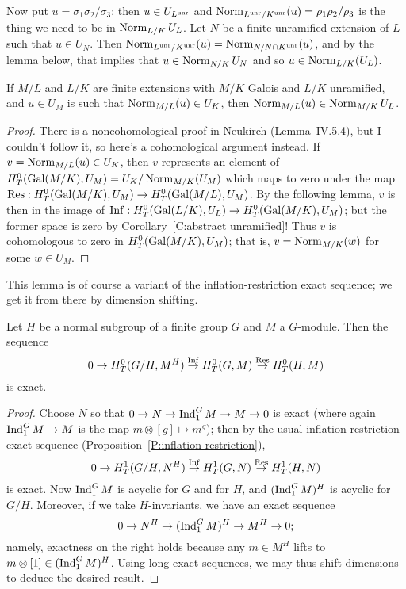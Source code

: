 Now put $u = \sigma_1 \sigma_2/\sigma_3$; then $u \in U_{L^{\operatorname{unr}}}$
and $\operatorname{Norm}_{L^{\operatorname{unr}}/K^{\operatorname{unr}}}(u) = \rho_1 \rho_2/\rho_3$ is the thing
we need to be in $\operatorname{Norm}_{L/K} U_L$. Let $N$ be a finite unramified
extension of $L$ such that $u \in U_N$. Then
$\operatorname{Norm}_{L^{\operatorname{unr}}/K^{\operatorname{unr}}}(u) = \operatorname{Norm}_{N/N \cap K^{\operatorname{unr}}}(u)$,
and by the lemma below, that implies that $u \in \operatorname{Norm}_{N/K} U_N$
and so $u \in \operatorname{Norm}_{L/K}(U_L)$.

\begin{lemma}
If $M/L$ and $L/K$ are finite extensions with $M/K$ Galois and
$L/K$ unramified, and
$u \in U_M$ is such that $\operatorname{Norm}_{M/L}(u) \in U_K$, then
$\operatorname{Norm}_{M/L}(u) \in \operatorname{Norm}_{M/K} U_L$.
\end{lemma}
\begin{proof}
There is a noncohomological proof in Neukirch (Lemma~IV.5.4), but
I couldn't follow it, so here's a cohomological argument instead.
If $v = \operatorname{Norm}_{M/L}(u) \in U_K$, then
$v$ represents an element of $H^0_T(\operatorname{Gal}(M/K), U_M) = U_K/\operatorname{Norm}_{M/K}(U_M)$
which maps
to zero under the map $\operatorname{Res}: H^0_T(\operatorname{Gal}(M/K), U_M) \to H^0_T(\operatorname{Gal}(M/L),
U_M)$. By the following lemma, $v$ is then in the image of
$\operatorname{Inf}: H^0_T(\operatorname{Gal}(L/K), U_L) \to H^0_T(\operatorname{Gal}(M/K), U_M)$; but the
former space is zero by Corollary~\ref{C:abstract unramified}! Thus $v$ is cohomologous to zero in
$H^0_T(\operatorname{Gal}(M/K), U_M)$; that is, $v = \operatorname{Norm}_{M/K}(w)$ for
some $w \in U_M$.
\end{proof}
This lemma is of course a variant of the inflation-restriction
exact sequence; we get it from there by dimension shifting.
\begin{lemma}
Let $H$ be a normal subgroup of a finite group $G$ and $M$ a
$G$-module. Then
the sequence
\[
0 \to H^0_T(G/H, M^H) \stackrel{\operatorname{Inf}}{\to}
H^0_T(G,M) \stackrel{\operatorname{Res}}{\to}
H^0_T(H,M)
\]
is exact.
\end{lemma}
\begin{proof}
Choose $N$ so that
$0 \to N \to \operatorname{Ind}^G_{1} M \to M \to 0$ is exact
(where again $\operatorname{Ind}^G_1 M \to M$ is the map $m \otimes [g] \mapsto m^g$);
then by the usual inflation-restriction
exact sequence (Proposition~\ref{P:inflation restriction}),
\[
0 \to H^1_T(G/H, N^H) \stackrel{\operatorname{Inf}}{\to} H^1_T(G,N)
\stackrel{\operatorname{Res}}{\to} H^1_T(H,N)
\]
is exact.
Now $\operatorname{Ind}^G_{1} M$ is acyclic
for $G$ and for $H$, and $(\operatorname{Ind}^G_1 M)^H$ is acyclic for $G/H$.
Moreover, if we take $H$-invariants, we have
an exact sequence
\[
0 \to N^H \to (\operatorname{Ind}^G_1 M)^H \to M^H \to 0;
\]
namely, exactness on the right holds because any $m \in M^H$
lifts to $m \otimes [1] \in (\operatorname{Ind}^G_1 M)^H$.
Using long exact sequences, we may thus shift dimensions to deduce the desired result.
\end{proof}

